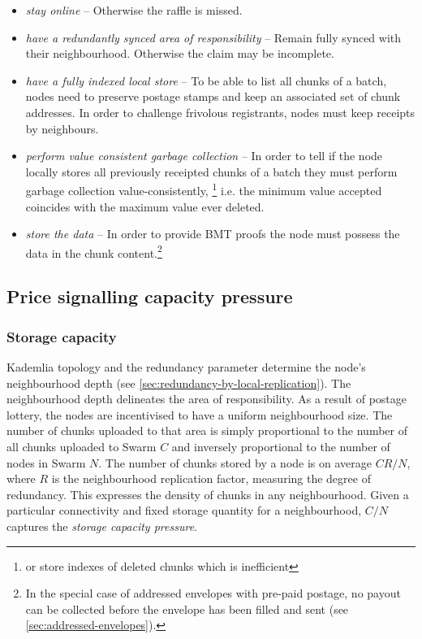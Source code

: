 \begin{itemize}
\item \emph{stay online} -- Otherwise the raffle is missed.
\item \emph{have a redundantly synced area of responsibility} -- Remain fully synced with their neighbourhood. Otherwise the claim may be incomplete.
\item \emph{have a fully indexed local store} -- To be able to list all chunks of a batch, nodes need to preserve postage stamps and keep an associated set of chunk addresses. In order to challenge frivolous registrants, nodes must keep receipts by neighbours.
\item \emph{perform value consistent garbage collection} -- In order to tell if the node locally stores all previously receipted chunks of a batch they must perform garbage collection value-consistently,%
%
\footnote{or store indexes of deleted chunks which is inefficient}
i.e. the minimum value accepted coincides with the maximum value ever deleted.
%
\item \emph{store the data} -- In order to provide BMT proofs the node must possess the data in the chunk content.\footnote{In the special case of addressed envelopes with pre-paid postage, no payout can be collected before the envelope has been filled and sent (see \ref{sec:addressed-envelopes}).}
\end{itemize}



\subsection{Price signalling capacity pressure \statusyellow}\label{sec:capacity-pressure}

\yellow{}

\subsubsection{Storage capacity}
Kademlia topology and the redundancy parameter determine the node's neighbourhood depth (see \ref{sec:redundancy-by-local-replication}). The neighbourhood depth delineates the area of responsibility. As a result of postage lottery, the nodes are incentivised to have a uniform neighbourhood size. The number of chunks uploaded to that area is simply proportional to the number of all chunks uploaded to Swarm $C$ and inversely proportional to the number of nodes in Swarm $N$. The number of chunks stored by a node is on average $CR/N$, where $R$ is the neighbourhood replication factor, measuring the degree of redundancy. This expresses the density of chunks in any neighbourhood. Given a particular connectivity and fixed storage quantity for a neighbourhood, $C/N$ captures the \emph{storage capacity pressure}. 

